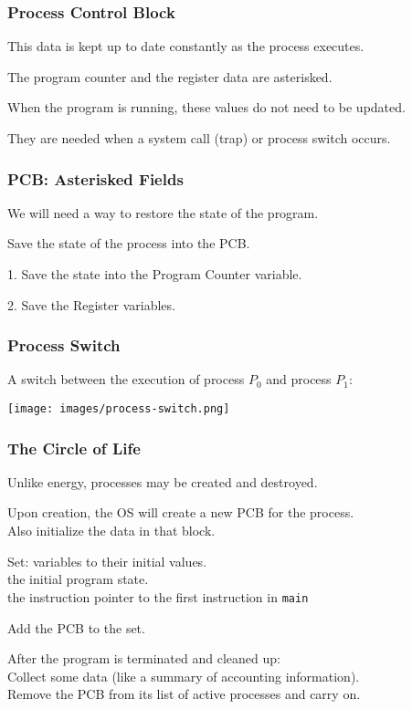 \begin{frame}
	\frametitle{Process Control Block}

	This data is kept up to date constantly as the process executes.

	The program counter and the register data are asterisked.

	When the program is running, these values do not need to be updated.

	They are needed when a system call (trap) or process switch occurs.

\end{frame}

\begin{frame}
	\frametitle{PCB: Asterisked Fields}
	We will need a way to restore the state of the program.

	Save the state of the process into the PCB.

	1. Save the state into the Program Counter variable.

	2. Save the Register variables.

\end{frame}

\begin{frame}
	\frametitle{Process Switch}

	A switch between the execution of process $P_{0}$ and process $P_{1}$:

	\begin{center}
		\texttt{[image: images/process-switch.png]}
	\end{center}

\end{frame}


\begin{frame}
	\frametitle{The Circle of Life}


	Unlike energy, processes may be created and destroyed.

	Upon creation, the OS will create a new PCB for the process.\\
	\quad Also initialize the data in that block.

	Set: variables to their initial values.\\
	\quad the initial program state.\\
	\quad the instruction pointer to the first instruction in \texttt{main}

	Add the PCB to the set.

	After the program is terminated and cleaned up:\\
	\quad Collect some data (like a summary of accounting information).\\
	\quad Remove the PCB from its list of active processes and carry on.


\end{frame}


